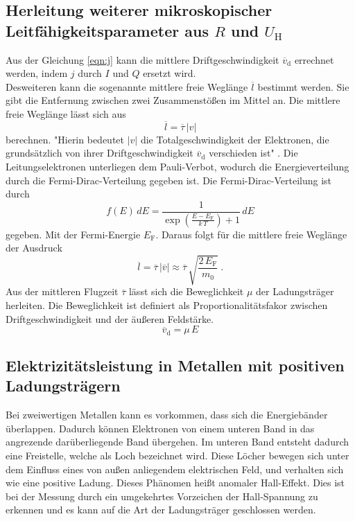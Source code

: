 \subsection{Herleitung weiterer mikroskopischer Leitfähigkeitsparameter aus $R$ und $U_\text{H}$}
Aus der Gleichung \eqref{eqn:j} kann die mittlere Driftgeschwindigkeit $\overline{v}_\text{d}$ errechnet werden, indem $j$ durch $I$ und $Q$ ersetzt wird. \\
Desweiteren kann die sogenannte mittlere freie Weglänge $\overline{l}$ bestimmt werden. Sie gibt die Entfernung zwischen zwei Zusammenstößen im Mittel an. Die mittlere freie Weglänge lässt sich aus
\begin{equation}
	\overline{l} = \overline{\tau}\,|v|
	\label{eqn:l}
\end{equation}
berechnen. "Hierin bedeutet $|v|$ die Totalgeschwindigkeit der Elektronen, die grundsätzlich von ihrer Driftgeschwindigkeit $\overline{v}_\text{d}$ verschieden ist" \cite[6]{sample}. Die Leitungselektronen unterliegen dem Pauli-Verbot, wodurch die Energieverteilung durch die Fermi-Dirac-Verteilung gegeben ist. Die Fermi-Dirac-Verteilung ist durch
\begin{equation}
	f(E)\,dE = \frac{1}{\exp\left(\frac{E - E_\text{F}}{k\,T}\right) + 1}\,dE
\end{equation}
gegeben. Mit der Fermi-Energie $E_\text{F}$. Daraus folgt für die mittlere freie Weglänge der Ausdruck
\begin{equation}
	\overline{l} = \overline{\tau}\,|\overline{v}| \approx \overline{\tau}\,\sqrt{\frac{2\,E_\text{F}}{m_0}} \ .
\end{equation}
Aus der mittleren Flugzeit $\overline{\tau}$ lässt sich die Beweglichkeit $\mu$ der Ladungsträger herleiten. Die Beweglichkeit ist definiert als Proportionalitätsfakor zwischen Driftgeschwindigkeit und der äußeren Feldstärke.
\begin{equation}
	\overline{v}_\text{d} = \mu\,E
\end{equation}


\subsection{Elektrizitätsleistung in Metallen mit positiven Ladungsträgern}
Bei zweiwertigen Metallen kann es vorkommen, dass sich die Energiebänder überlappen. Dadurch können Elektronen von einem unteren Band in das angrezende darüberliegende Band übergehen. Im unteren Band entsteht dadurch eine Freistelle, welche als Loch bezeichnet wird. Diese Löcher bewegen sich unter dem Einfluss eines von außen anliegendem elektrischen Feld, und verhalten sich wie eine positive Ladung. Dieses Phänomen heißt anomaler Hall-Effekt. Dies ist bei der Messung durch ein umgekehrtes Vorzeichen der Hall-Spannung zu erkennen und es kann auf die Art der Ladungsträger geschlossen werden.







